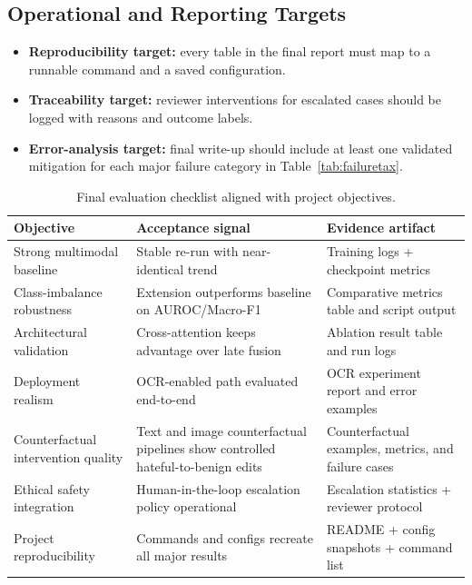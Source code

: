 \documentclass[11pt]{article}
\begin{document}
\subsection{Operational and Reporting Targets}
\begin{itemize}[leftmargin=*]
  \item \textbf{Reproducibility target:} every table in the final report must map to a runnable command and a saved configuration.
  \item \textbf{Traceability target:} reviewer interventions for escalated cases should be logged with reasons and outcome labels.
  \item \textbf{Error-analysis target:} final write-up should include at least one validated mitigation for each major failure category in Table~\ref{tab:failuretax}.
\end{itemize}

\begin{table}[t]
\centering
\small
\caption{Final evaluation checklist aligned with project objectives.}
\begin{tabularx}{\textwidth}{l l X}
\toprule
Objective & Acceptance signal & Evidence artifact \\
\midrule
Strong multimodal baseline & Stable re-run with near-identical trend & Training logs + checkpoint metrics \\
Class-imbalance robustness & Extension outperforms baseline on AUROC/Macro-F1 & Comparative metrics table and script output \\
Architectural validation & Cross-attention keeps advantage over late fusion & Ablation result table and run logs \\
Deployment realism & OCR-enabled path evaluated end-to-end & OCR experiment report and error examples \\
Counterfactual intervention quality & Text and image counterfactual pipelines show controlled hateful-to-benign edits & Counterfactual examples, metrics, and failure cases \\
Ethical safety integration & Human-in-the-loop escalation policy operational & Escalation statistics + reviewer protocol \\
Project reproducibility & Commands and configs recreate all major results & README + config snapshots + command list \\
\bottomrule
\end{tabularx}
\label{tab:successchecklist}
\end{table}
\end{document}
